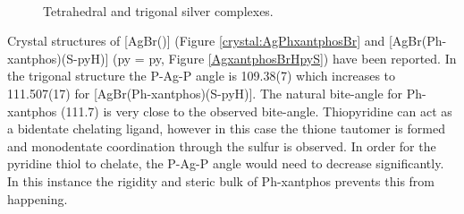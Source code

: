 \begin{figure}[htbp]
\begin{subfigure}[b]{0.3\textwidth}
	\caption{}
	\label{AgxantphosBr}
\end{subfigure}
\\
\caption[Silver \Phxantphos{} complexes]{Tetrahedral and trigonal silver \Phxantphos{} complexes.}
\label{AgPhxantphos}
\end{figure}



Crystal structures of [AgBr(\Phxantphos)] (Figure \ref{crystal:AgPhxantphosBr} and [AgBr(Ph-xantphos)(S-pyH)] (\acrshort{py} = \acrlong{py}, Figure \ref{AgxantphosBrHpyS}) have been reported.\cite{Kaltzoglou2007}  In the trigonal structure the P-Ag-P angle is 109.38(7)\degrees{} which increases to 111.507(17)\degrees{} for [AgBr(Ph-xantphos)(S-pyH)].  The natural bite-angle for Ph-xantphos (111.7\degrees)\cite{Birkholz2009} is very close to the observed bite-angle.  Thiopyridine can act as a bidentate chelating ligand, however in this case the thione tautomer is formed and monodentate coordination through the sulfur is observed.  In order for the pyridine thiol to chelate, the P-Ag-P angle would need to decrease significantly.  In this instance the rigidity and steric bulk of Ph-xantphos prevents this from happening.\cite{Kaltzoglou2007}

